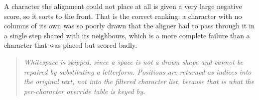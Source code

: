 A character the alignment could not place at all is given a very large negative score, so it sorts to the front. That is the correct ranking: a character with no columns of its own was so poorly drawn that the aligner had to pass through it in a single step shared with its neighbours, which is a more complete failure than a character that was placed but scored badly.


\begin{quote}\small\itshape Whitespace is skipped, since a space is not a drawn shape and cannot be repaired by substituting a letterform. Positions are returned as indices into the original text, not into the filtered character list, because that is what the per-character override table is keyed by.\end{quote}

